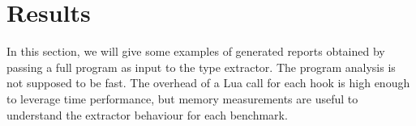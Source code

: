 \chapter{Results}
\label{cha:Results}
In this section, we will give some examples of generated reports obtained by passing a full program as input to the type extractor. The program analysis is not supposed to be fast. The overhead of a Lua call for each hook is high enough to leverage time performance, but memory measurements are useful to understand the extractor behaviour for each benchmark.
% 
